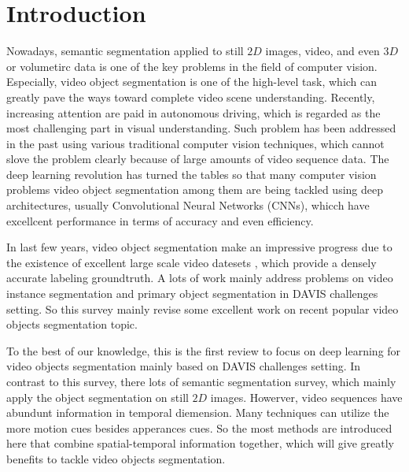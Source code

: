 \section{Introduction}
Nowadays, semantic segmentation applied to still $2D$ images, video, and even $3D$ or volumetirc data is one of the key problems in the field of computer vision.
Especially, video object segmentation is one of the high-level task, which can greatly pave the ways toward complete video scene understanding.
Recently, increasing attention are paid in autonomous driving\cite{geiger2012we, cordts2016cityscapes, ess2009segmentation}, which is regarded as the most challenging part in visual understanding. 
Such problem has been addressed in the past using various traditional computer vision techniques, which cannot slove the problem clearly because of large amounts of video sequence data.
The deep learning revolution has turned the tables so that many computer vision problems
video object segmentation among them are being tackled using deep architectures, usually Convolutional Neural Networks (CNNs)\cite{farabet2013learning, ning2005toward}, whicch have excellcent 
performance in terms of accuracy and even efficiency.

In last few years, video object segmentation make an impressive progress due to the existence of excellent large scale video datesets \cite{DAVIS2016, SegTrack, Youtube}, which provide a densely
accurate labeling groundtruth. A lots of work mainly address problems on video instance segmentation and primary object segmentation in DAVIS challenges setting. So this survey mainly revise some 
excellent work on recent popular video objects  segmentation topic.

To the best of our knowledge, this is the first review to focus on deep learning for video objects segmentation mainly based on DAVIS challenges setting. In contrast to this survey, there lots of 
semantic segmentation survey, which mainly apply the object segmentation on still $2D$ images. Howerver, video sequences have abundunt information in temporal diemension. Many techniques can utilize
the more motion cues besides apperances cues. So the most methods are introduced here that combine spatial-temporal information together, which will give greatly benefits to tackle video objects 
segmentation. 

